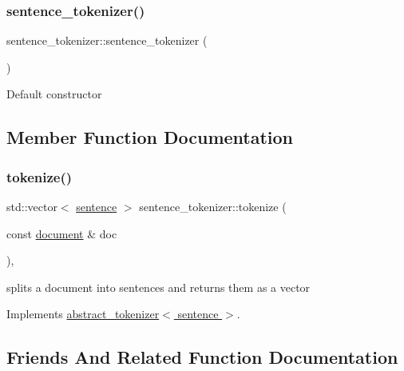 \subsubsection{\texorpdfstring{sentence\+\_\+tokenizer()}{sentence\_tokenizer()}}
{\footnotesize\ttfamily sentence\+\_\+tokenizer\+::sentence\+\_\+tokenizer (\begin{DoxyParamCaption}{ }\end{DoxyParamCaption})}

Default constructor 

\subsection{Member Function Documentation}
\mbox{\label{classsentence__tokenizer_abd8fdaae180f7c8c6dea91c68f7b8865}} 
\subsubsection{\texorpdfstring{tokenize()}{tokenize()}}
{\footnotesize\ttfamily std\+::vector$<$ \hyperlink{classsentence}{sentence} $>$ sentence\+\_\+tokenizer\+::tokenize (\begin{DoxyParamCaption}\item[{const \hyperlink{classdocument}{document} \&}]{doc }\end{DoxyParamCaption})\hspace{0.3cm}{\ttfamily [override]}, {\ttfamily [virtual]}}

splits a document into sentences and returns them as a vector 

Implements \hyperlink{classabstract__tokenizer_aeea4a861fdfa18351555b0d00a378165}{abstract\+\_\+tokenizer$<$ sentence $>$}.



\subsection{Friends And Related Function Documentation}
\mbox{\label{classsentence__tokenizer_a117c39aafe92e99e106009e113640bc5}} 
